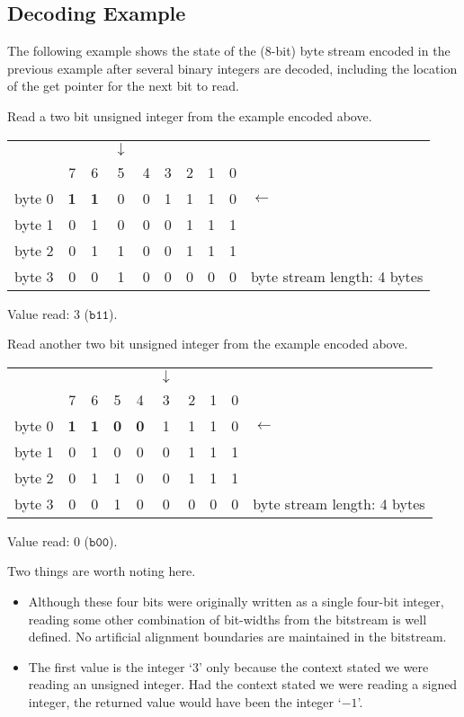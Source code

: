 \documentclass[9pt,letterpaper]{book}
\newcommand{\bin}[1]{\ensuremath{\mathtt{b#1}}}
\numberwithin{equation}{chapter}
\numberwithin{figure}{chapter}
\numberwithin{table}{chapter}
\begin{document}
\subsection{Decoding Example}

The following example shows the state of the (8-bit) byte stream encoded in the
 previous example after several binary integers are decoded, including the
 location of the get pointer for the next bit to read.

Read a two bit unsigned integer from the example encoded above.

\begin{tabular}{r|ccccccccl}
\multicolumn{1}{r}{} &&&$\downarrow$&&&&&&              \\
         & 7 & 6 & 5 & 4 & 3 & 2 & 1 & 0 &              \\\cline{1-9}
byte 0   & \textbf{1} & \textbf{1} & 0 & 0 & 1 & 1 & 1 & 0 & $\leftarrow$ \\
byte 1   & 0 & 1 & 0 & 0 & 0 & 1 & 1 & 1 &              \\
byte 2   & 0 & 1 & 1 & 0 & 0 & 1 & 1 & 1 &              \\
byte 3   & 0 & 0 & 1 & 0 & 0 & 0 & 0 & 0 &
byte stream length: 4 bytes
\end{tabular}
\vspace{\baselineskip}

Value read: 3 (\bin{11}).

Read another two bit unsigned integer from the example encoded above.

\begin{tabular}{r|ccccccccl}
\multicolumn{1}{r}{} &&&&&$\downarrow$&&&&              \\
         & 7 & 6 & 5 & 4 & 3 & 2 & 1 & 0 &              \\\cline{1-9}
byte 0   & \textbf{1} & \textbf{1} & \textbf{0} & \textbf{0} &
                           1 & 1 & 1 & 0 & $\leftarrow$ \\
byte 1   & 0 & 1 & 0 & 0 & 0 & 1 & 1 & 1 &              \\
byte 2   & 0 & 1 & 1 & 0 & 0 & 1 & 1 & 1 &              \\
byte 3   & 0 & 0 & 1 & 0 & 0 & 0 & 0 & 0 &
byte stream length: 4 bytes
\end{tabular}
\vspace{\baselineskip}

Value read: 0 (\bin{00}).

Two things are worth noting here.
\begin{itemize}
\item
Although these four bits were originally written as a single four-bit integer,
 reading some other combination of bit-widths from the bitstream is well
 defined.
No artificial alignment boundaries are maintained in the bitstream.
\item
The first value is the integer `$3$' only because the context stated we were
 reading an unsigned integer.
Had the context stated we were reading a signed integer, the returned value
 would have been the integer `$-1$'.
\end{itemize}
\end{document}
